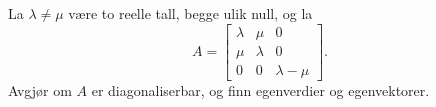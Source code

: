 \begin{oppgave}
La $\lambda\neq \mu$ være to reelle tall, begge ulik null, og la
$$A=
\begin{bmatrix}
\lambda & \mu & 0\\
\mu & \lambda & 0\\
0 & 0 & \lambda-\mu
\end{bmatrix}.$$
Avgjør om $A$ er diagonaliserbar, og finn egenverdier og egenvektorer.
\end{oppgave}

%
%
%
%
%
%
%


%
%
%
%
%
%
%


